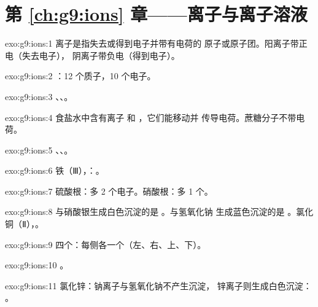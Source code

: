 \section*{第 \ref{ch:g9:ions} 章——离子与离子溶液}

\begin{solution}{exo:g9:ions:1}
离子是指失去或得到电子并带有电荷的
原子或原子团。阳离子带正电（失去电子），
阴离子带负电（得到电子）。
\end{solution}

\begin{solution}{exo:g9:ions:2}
：12 个质子，10 个电子。
\end{solution}

\begin{solution}{exo:g9:ions:3}
、、。
\end{solution}

\begin{solution}{exo:g9:ions:4}
食盐水中含有离子  和 ，它们能移动并
传导电荷。蔗糖分子不带电荷。
\end{solution}

\begin{solution}{exo:g9:ions:5}
、、。
\end{solution}

\begin{solution}{exo:g9:ions:6}
铁（Ⅲ），：。
\end{solution}

\begin{solution}{exo:g9:ions:7}
硫酸根：多 2 个电子。硝酸根：多 1 个。
\end{solution}

\begin{solution}{exo:g9:ions:8}
与硝酸银生成白色沉淀的是 。与氢氧化钠
生成蓝色沉淀的是 。氯化铜（Ⅱ），。
\end{solution}

\begin{solution}{exo:g9:ions:9}
四个：每侧各一个（左、右、上、下）。
\end{solution}

\begin{solution}{exo:g9:ions:10}
。
\end{solution}

\begin{solution}{exo:g9:ions:11}
氯化锌：钠离子与氢氧化钠不产生沉淀，
锌离子则生成白色沉淀：
。
\end{solution}

